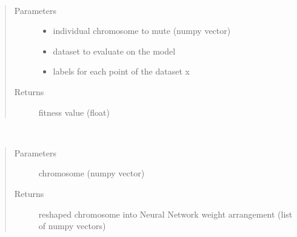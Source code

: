 \documentclass[letterpaper,10pt,english]{sphinxmanual}
\begin{document}
\begin{fulllineitems}
\begin{fulllineitems}
\label{\detokenize{index:genetic_optimizer.GeneticNeuralWeightOptimizer.fitness}}~\begin{quote}\begin{description}
\item[{Parameters}] \leavevmode\begin{itemize}
\item {} 
 \textendash{} individual chromosome to mute (numpy vector)

\item {} 
 \textendash{} dataset to evaluate on the model

\item {} 
 \textendash{} labels for each point of the dataset x

\end{itemize}

\item[{Returns}] \leavevmode
fitness value (float)

\end{description}\end{quote}

\end{fulllineitems}


\begin{fulllineitems}
\label{\detokenize{index:genetic_optimizer.GeneticNeuralWeightOptimizer.transform_weights}}~\begin{quote}\begin{description}
\item[{Parameters}] \leavevmode
{} \textendash{} chromosome (numpy vector)

\item[{Returns}] \leavevmode
reshaped chromosome into Neural Network weight arrangement (list of numpy vectors)

\end{description}\end{quote}


\end{fulllineitems}
\end{fulllineitems}
\end{document}
